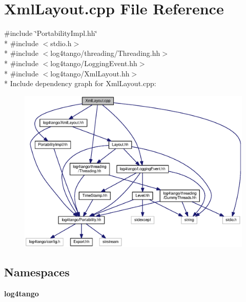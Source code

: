 \section{Xml\-Layout.\-cpp File Reference}
\label{XmlLayout_8cpp}
{\ttfamily \#include \char`\"{}Portability\-Impl.\-hh\char`\"{}}\\*
{\ttfamily \#include $<$stdio.\-h$>$}\\*
{\ttfamily \#include $<$log4tango/threading/\-Threading.\-hh$>$}\\*
{\ttfamily \#include $<$log4tango/\-Logging\-Event.\-hh$>$}\\*
{\ttfamily \#include $<$log4tango/\-Xml\-Layout.\-hh$>$}\\*
Include dependency graph for Xml\-Layout.\-cpp\-:
\nopagebreak
\begin{figure}[H]
\begin{center}
\leavevmode
\includegraphics[width=350pt]{d8/d7a/XmlLayout_8cpp__incl}
\end{center}
\end{figure}
\subsection*{Namespaces}
\begin{DoxyCompactItemize}
\item 
{\bf log4tango}
\end{DoxyCompactItemize}

